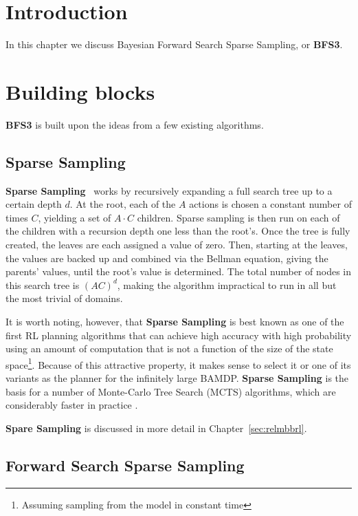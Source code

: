 \label{chap:bfs3}


\section{Introduction}

In this chapter we discuss Bayesian Forward Search Sparse Sampling, or {\bf BFS3}.

\section{Building blocks}

{\bf BFS3} is built upon the ideas from a few existing algorithms.

\subsection{Sparse Sampling}

{\bf Sparse Sampling}~\cite{kearns99b} works by recursively expanding a full search tree up to a certain depth $d$. At the root, each of the $A$ actions is chosen a constant number of times $C$, yielding a set of $A\cdot C$ children. Sparse sampling is then run on each of the children with a recursion depth one less than the root's. Once the tree is fully created, the leaves are each assigned a value of zero. Then, starting at the leaves, the values are backed up and combined via the Bellman equation, giving the parents' values, until the root's value is determined. The total number of nodes in this search tree is $(AC)^d$, making the algorithm impractical to run in all but the most trivial of domains.

It is worth noting, however, that {\bf Sparse Sampling} is best known as one of the first RL planning algorithms that can achieve high accuracy with high probability using an amount of computation that is not a function of the size of the state space\footnote{Assuming sampling from the model in constant time}. Because of this attractive property, it makes sense to select it or one of its variants as the planner for the infinitely large BAMDP.  {\bf Sparse Sampling} is the basis for a number of Monte-Carlo Tree Search (MCTS) algorithms, which are considerably faster in practice \cite{kocsis06,walsh10,wang05}.

{\bf Spare Sampling} is discussed in more detail in Chapter~\ref{sec:relmbbrl}.

\subsection{Forward Search Sparse Sampling}

